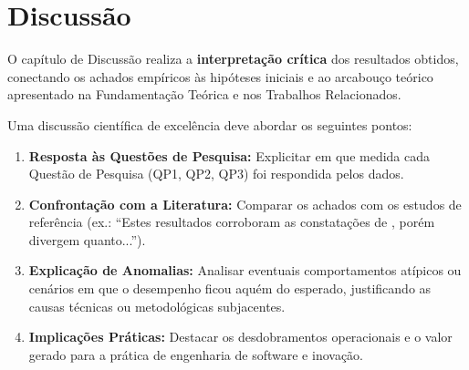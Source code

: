 \chapter{Discussão}
\label{chap:discussao}

O capítulo de Discussão realiza a \textbf{interpretação crítica} dos resultados obtidos, conectando os achados empíricos às hipóteses iniciais e ao arcabouço teórico apresentado na Fundamentação Teórica e nos Trabalhos Relacionados.

Uma discussão científica de excelência deve abordar os seguintes pontos:
\begin{enumerate}
    \item \textbf{Resposta às Questões de Pesquisa:} Explicitar em que medida cada Questão de Pesquisa (QP1, QP2, QP3) foi respondida pelos dados.
    \item \textbf{Confrontação com a Literatura:} Comparar os achados com os estudos de referência (ex.: \enquote{Estes resultados corroboram as constatações de \cite{akhtar2018threat}, porém divergem quanto...}).
    \item \textbf{Explicação de Anomalias:} Analisar eventuais comportamentos atípicos ou cenários em que o desempenho ficou aquém do esperado, justificando as causas técnicas ou metodológicas subjacentes.
    \item \textbf{Implicações Práticas:} Destacar os desdobramentos operacionais e o valor gerado para a prática de engenharia de software e inovação.
\end{enumerate}